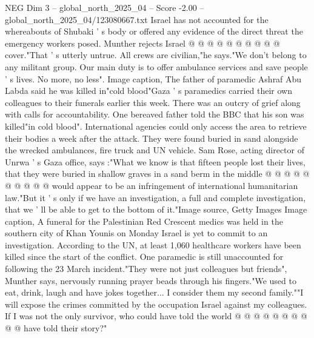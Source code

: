 \begin{textsample}{NEG Dim 3 – global\_north\_2025\_04 – Score -2.00 – global\_north\_2025\_04/123080667.txt}
Israel has not accounted for the whereabouts of Shubaki ' s body or offered any evidence of the direct threat the emergency workers posed.
Munther rejects Israel @ @ @ @ @ @ @ @ @ @ cover."That ' s utterly untrue.
All crews are civilian,"he says."We don't belong to any militant group.
Our main duty is to offer ambulance services and save people ' s lives.
No more, no less".
Image caption, The father of paramedic Ashraf Abu Labda said he was killed in"cold blood"Gaza ' s paramedics carried their own colleagues to their funerals earlier this week.
There was an outcry of grief along with calls for accountability.
One bereaved father told the BBC that his son was killed"in cold blood".
International agencies could only access the area to retrieve their bodies a week after the attack.
They were found buried in sand alongside the wrecked ambulances, fire truck and UN vehicle.
Sam Rose, acting director of Unrwa ' s Gaza office, says :"What we know is that fifteen people lost their lives, that they were buried in shallow graves in a sand berm in the middle @ @ @ @ @ @ @ @ @ @ would appear to be an infringement of international humanitarian law."But it ' s only if we have an investigation, a full and complete investigation, that we ' ll be able to get to the bottom of it."Image source, Getty Images Image caption, A funeral for the Palestinian Red Crescent medics was held in the southern city of Khan Younis on Monday Israel is yet to commit to an investigation.
According to the UN, at least 1,060 healthcare workers have been killed since the start of the conflict.
One paramedic is still unaccounted for following the 23 March incident."They were not just colleagues but friends", Munther says, nervously running prayer beads through his fingers."We used to eat, drink, laugh and have jokes together...
I consider them my second family.""I will expose the crimes committed by the occupation Israel against my colleagues.
If I was not the only survivor, who could have told the world @ @ @ @ @ @ @ @ @ @ have told their story?"

\end{textsample}
